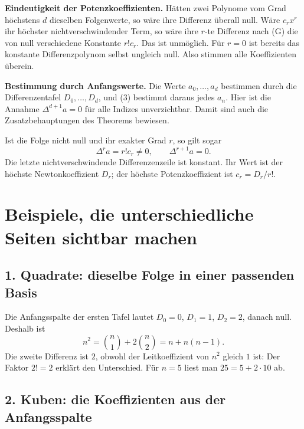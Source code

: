 \textbf{Eindeutigkeit der Potenzkoeffizienten.}
Hätten zwei Polynome vom Grad höchstens $d$ dieselben Folgenwerte,
so wäre ihre Differenz überall null. Wäre $c_rx^r$ ihr höchster
nichtverschwindender Term, so wäre ihre $r$-te Differenz nach (G)
die von null verschiedene Konstante $r!c_r$. Das ist unmöglich.
Für $r=0$ ist bereits das konstante Differenzpolynom selbst ungleich
null. Also stimmen alle Koeffizienten überein.

\textbf{Bestimmung durch Anfangswerte.}
Die Werte $a_0,\ldots,a_d$ bestimmen durch die Differenzentafel
$D_0,\ldots,D_d$, und (3) bestimmt daraus jedes $a_n$.
Hier ist die Annahme $\Delta^{d+1}a=0$ für alle Indizes unverzichtbar.
Damit sind auch die Zusatzbehauptungen des Theorems bewiesen.

Ist die Folge nicht null und ihr exakter Grad $r$, so gilt sogar
\[
 \Delta^r a=r!c_r\ne0,\qquad \Delta^{r+1}a=0.
\]
Die letzte nichtverschwindende Differenzenzeile ist konstant.
Ihr Wert ist der höchste Newtonkoeffizient $D_r$; der höchste
Potenzkoeffizient ist $c_r=D_r/r!$.

\section{Beispiele, die unterschiedliche Seiten sichtbar machen}

\subsection*{1. Quadrate: dieselbe Folge in einer passenden Basis}

Die Anfangsspalte der ersten Tafel lautet $D_0=0$, $D_1=1$,
$D_2=2$, danach null. Deshalb ist
\[
 n^2=\binom n1+2\binom n2=n+n(n-1).
\]
Die zweite Differenz ist $2$, obwohl der Leitkoeffizient von $n^2$
gleich $1$ ist: Der Faktor $2!=2$ erklärt den Unterschied.
Für $n=5$ liest man $25=5+2\cdot10$ ab.

\subsection*{2. Kuben: die Koeffizienten aus der Anfangsspalte}


